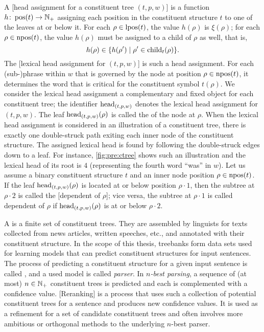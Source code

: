 \documentclass[../document.tex]{subfiles}
\begin{document}
    A [head assignment for a constituent tree $(t,p,w)$] is a function \(h\colon \operatorname{pos}(t) \to \mathbb{N}_+\) assigning each position in the constituent structure \(t\) to one of the leaves at or below it.
    For each \(\rho \in \operatorname{lpos}(t)\), the value \(h(\rho)\) is \(\xi(\rho)\); for each \(\rho \in \operatorname{npos}(t)\), the value \(h(\rho)\) must be assigned to a child of \(\rho\) as well, that is, \[
        h(\rho) \in \{ h(\rho') \mid \rho' \in \operatorname{child}_t(\rho) \} \text{.}
    \]
    The [lexical head assignment for $(t,p,w)$] is such a head assignment.
    For each (sub-)phrase within \(w\) that is governed by the node at position \(\rho \in \operatorname{npos}(t)\), it determines the word that is critical for the constituent symbol \(t(\rho)\).
    We consider the lexical head assignment a complementary and fixed object for each constituent tree; the identifier \(\operatorname{head}_{(t,p,w)}\) denotes the lexical head assignment for \((t,p,w)\).
    The leaf \(\operatorname{head}_{(t,p,w)}(\rho)\) is called the  of the node at \(\rho\).
    When the lexical head assignment is considered in an illustration of a constituent tree, there is exactly one double-struck path exiting each inner node of the constituent structure.
    The assigned lexical head is found by following the double-struck edges down to a leaf.
    For instance, \cref{fig:pre:ctree} shows such an illustration and the lexical head of its root is \(4\) (representing the fourth word ``was'' in $w$).
    Let us assume a binary constituent structure \(t\) and an inner node position \(\rho \in \operatorname{npos}(t)\).
    If the leaf \(\operatorname{head}_{(t,p,w)}(\rho)\) is located at or below position \(\rho \cdot 1\), then the subtree at \(\rho \cdot 2\) is called the [dependent of $\rho$]; vice versa, the subtree at \(\rho \cdot 1\) is called dependent of $\rho$ if \(\operatorname{head}_{(t,p,w)}(\rho)\) is at or below \(\rho \cdot 2\).

    A  is a finite set of constituent trees.
    They are assembled by linguists for texts collected from news articles, written speeches, etc., and annotated with their constituent structure.
    In the scope of this thesis, treebanks form data sets used for learning models that can predict constituent structures for input sentences.
    The process of predicting a constituent structure for a given input sentence is called , and a used model is called \emph{parser}.
    In \emph{\(n\)-best parsing}, a sequence of (at most) \(n \in \mathbb{N}_+\) constituent trees is predicted and each is complemented with a confidence value.
    [Reranking] is a process that uses such a collection of potential constituent trees for a sentence and produces new confidence values.
    It is used as a refinement for a set of candidate constituent trees and often involves more ambitious or orthogonal methods to the underlying \(n\)-best parser.
\end{document}
